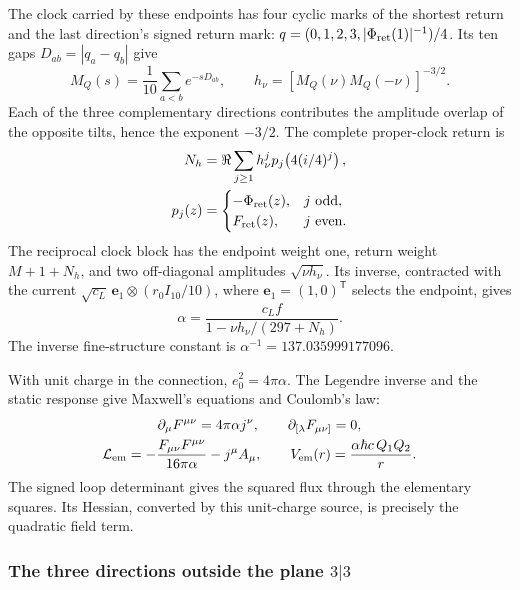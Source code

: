 \documentclass[aps,prx,reprint,longbibliography]{revtex4-2}
\providecommand{\Phis}{\Phi_{\rm ret}}
\providecommand{\Fret}{F_{\rm ret}}
\begin{document}
The clock carried by these endpoints has four cyclic marks of the shortest return and the last direction's signed return mark: $q=(0,1,2,3,|\Phis(1)|^{-1})/4$. Its ten gaps $D_{ab}=|q_a-q_b|$ give
\begin{equation}
 M_Q(s)=\frac1{10}\sum_{a<b}e^{-sD_{ab}},\qquad
 h_\nu=[M_Q(\nu)M_Q(-\nu)]^{-3/2}.
 \label{eq:hnu}
\end{equation}
Each of the three complementary directions contributes the amplitude overlap of the opposite tilts, hence the exponent $-3/2$. The complete proper-clock return is
\begin{equation}
 \begin{split}
 N_h&=\Re\sum_{j\ge1}h_\nu^j p_j\!\left(4(i/4)^j\right),\\
 p_j(z)&=\begin{cases}-\Phis(z),&j\ {\rm odd},\\
 \Fret(z),&j\ {\rm even}.
 \end{cases}
 \end{split}
 \label{eq:Nh}
\end{equation}
The reciprocal clock block has the endpoint weight one, return weight $M+1+N_h$, and two off-diagonal amplitudes $\sqrt{\nu h_\nu}$. Its inverse, contracted with the current $\sqrt{c_L}\,\mathbf e_1\otimes(r_0I_{10}/10)$, where $\mathbf e_1=(1,0)^{\mathsf T}$ selects the endpoint, gives
\begin{equation}
 \boxed{\alpha=\frac{c_Lf}{1-\nu h_\nu/(297+N_h)}}.
 \label{eq:alpha}
\end{equation}
The inverse fine-structure constant is $\alpha^{-1}=137.035999177096$.

With unit charge in the connection, $e_0^2=4\pi\alpha$. The Legendre inverse and the static response give Maxwell's equations and Coulomb's law:
\begin{equation}
 \begin{gathered}
 \partial_\mu F^{\mu\nu}=4\pi\alpha j^\nu,\qquad
 \partial_{[\lambda}F_{\mu\nu]}=0,\\
 \mathcal L_{\rm em}=-\frac{F_{\mu\nu}F^{\mu\nu}}{16\pi\alpha}-j^\mu A_\mu,
 \qquad V_{\rm em}(r)=\frac{\alpha\hbar c\,Q_1Q_2}{r}.
 \end{gathered}
 \label{eq:maxwell}
\end{equation}
The signed loop determinant gives the squared flux through the elementary squares. Its Hessian, converted by this unit-charge source, is precisely the quadratic field term.

\subsubsection{The three directions outside the plane \texorpdfstring{$3|3$}{3|3}}
\label{sec:colour}
\end{document}
